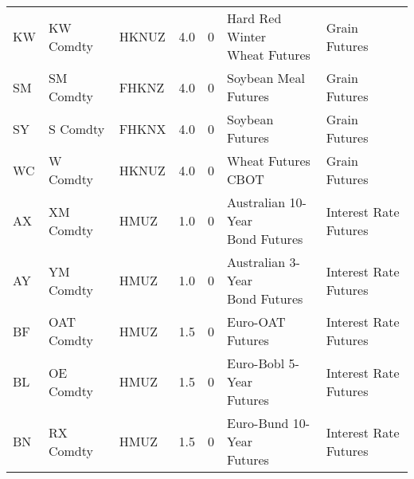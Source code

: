 \begin{longtable}{lllrrll}
                   KW &              KW Comdty &                     HKNUZ &                               4.0 &                        0 &                  \makecell{Hard Red Winter\\Wheat Futures} &           Grain Futures \\
                   SM &              SM Comdty &                     FHKNZ &                               4.0 &                        0 &                                       Soybean Meal Futures &           Grain Futures \\
                   SY &               S Comdty &                     FHKNX &                               4.0 &                        0 &                                            Soybean Futures &           Grain Futures \\
                   WC &               W Comdty &                     HKNUZ &                               4.0 &                        0 &                                         Wheat Futures CBOT &           Grain Futures \\
                   AX &              XM Comdty &                      HMUZ &                               1.0 &                        0 &                \makecell{Australian 10-Year\\Bond Futures} &   Interest Rate Futures \\
                   AY &              YM Comdty &                      HMUZ &                               1.0 &                        0 &                 \makecell{Australian 3-Year\\Bond Futures} &   Interest Rate Futures \\
                   BF &             OAT Comdty &                      HMUZ &                               1.5 &                        0 &                                           Euro-OAT Futures &   Interest Rate Futures \\
                   BL &              OE Comdty &                      HMUZ &                               1.5 &                        0 &                       \makecell{Euro-Bobl 5-Year\\Futures} &   Interest Rate Futures \\
                   BN &              RX Comdty &                      HMUZ &                               1.5 &                        0 &                      \makecell{Euro-Bund 10-Year\\Futures} &   Interest Rate Futures \\

\end{longtable}
